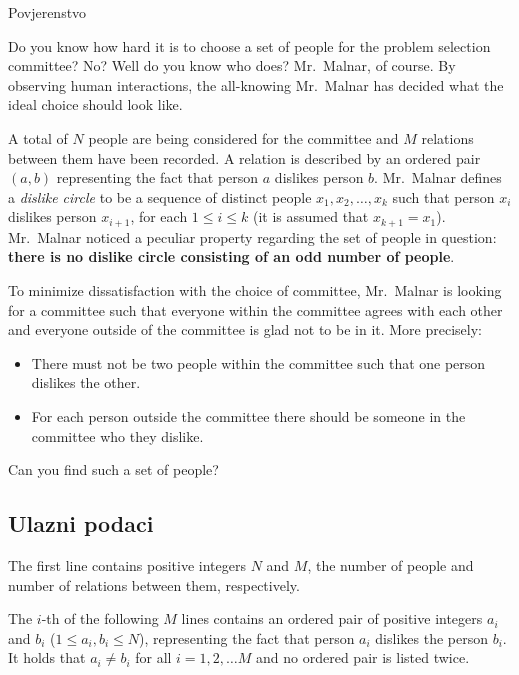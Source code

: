 \begin{statement}[
  problempoints=100,
  timelimit=3 seconds,
  memorylimit=512 MiB,
]{Povjerenstvo}

Do you know how hard it is to choose a set of people for the problem selection 
committee? No? Well do you know who does? Mr.\ Malnar, of course. By observing 
human interactions, the all-knowing Mr.\ Malnar has decided what the ideal 
choice should look like.

A total of $N$ people are being considered for the committee and $M$ relations 
between them have been recorded. A relation is described by an ordered pair 
$(a, b)$ representing the fact that person $a$ dislikes person $b$.  Mr.\ Malnar 
defines a \textit{dislike circle} to be a sequence of distinct people $x_1, x_2, \dots, x_k$
such that person $x_i$ dislikes person $x_{i+1}$, for each $1 \leq i \leq k$ 
(it is assumed that $x_{k+1} = x_1$). Mr.\ Malnar noticed a peculiar property 
regarding the set of people in question: \textbf{there is no dislike circle consisting 
of an odd number of people}.

To minimize dissatisfaction with the choice of committee, Mr.\ Malnar is looking for a 
committee such that everyone within the committee agrees with each other and everyone 
outside of the committee is glad not to be in it. More precisely:
\begin{itemize}
    \item There must not be two people within the committee such that one person dislikes the other.
    \item For each person outside the committee there should be someone in the committee who they dislike.
\end{itemize}

Can you find such a set of people?

\subsection*{Ulazni podaci}

The first line contains positive integers $N$ and $M$, the number of people and number
of relations between them, respectively.

The $i$-th of the following $M$ lines contains an ordered pair of positive 
integers $a_i$ and $b_i$ ($1 \leq a_i, b_i \leq N$), representing the fact 
that person $a_i$ dislikes the person $b_i$. It holds that $a_i \ne b_i$ for 
all $i = 1, 2, \dots M$ and no ordered pair is listed twice.


\end{statement}
